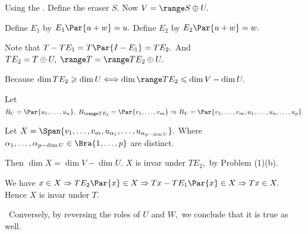 \par\quad
Using the \NOTEFOR\;[3.88,90,91]. Define the eraser $S.$ Now $V=\range S\oplus U.$\par\quad
Define $E_1$ by $E_1\Par{u+w}=u.$ Define $E_2$ by $E_2\Par{u+w}=w.$ \vspace{2pt}\par\quad
Note that $T-TE_1=T\Par{I-E_1}=TE_2.$ And $\null TE_2=\null T\oplus U,\;\range T=\range TE_2\oplus U.$\par\quad
Because $\dim\null TE_2\geqslant\dim U\Longleftrightarrow\dim\range TE_2\leqslant\dim V-\dim U.$\par\quad
Let $B_U=\Par{u_1,\dots,u_n},\;B_{\range TE_2}=\Par{v_1,\dots,v_m}\Rightarrow B_V=\Par{v_1,\dots,v_m,u_1,\dots,u_n,\dots,u_p}.$\par\quad
Let $X=\Span{v_1,\dots,v_m,u_{\alpha_1},\dots,u_{\alpha_{p-\dim U}}}.$ Where $\alpha_1,\dots,\alpha_{p-\dim U}\in\Bra{1,\dots,p}$ are distinct.\vspace{2pt}\par\quad
Then $\dim X=\dim V-\dim U.$  $X$ is invar under $TE_2,$ by Problem (1)(b).\vspace{2pt}\par\quad
We have $x\in X\Rightarrow TE_2\Par{x}\in X\Rightarrow T{x}-TE_1\Par{x}\in X\Rightarrow Tx\in X.$ Hence $X$ is invar under $T.$\PfEnd\quad
{}\par\quad
\Comment \,\,\,Conversely, by reversing the roles of $U$ and $W,$ we conclude that it is true as well.
